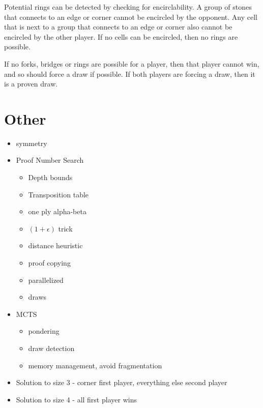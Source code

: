 Potential rings can be detected by checking for encirclability. A group of stones that connects to an edge or corner cannot be encircled by the opponent. Any cell that is next to a group that connects to an edge or corner also cannot be encircled by the other player. If no cells can be encircled, then no rings are possible.

If no forks, bridges or rings are possible for a player, then that player cannot win, and so should force a draw if possible. If both players are forcing a draw, then it is a proven draw.





\section{Other}

\begin{itemize}
\item symmetry
\item Proof Number Search
	\begin{itemize}
		\item Depth bounds
		\item Transposition table
		\item one ply alpha-beta
		\item $(1+\epsilon)$ trick
		\item distance heuristic
		\item proof copying
		\item parallelized
		\item draws
	\end{itemize}

\item MCTS
	\begin{itemize}
		\item pondering
		\item draw detection
		\item memory management, avoid fragmentation
	\end{itemize}

\item Solution to size 3 - corner first player, everything else second player
\item Solution to size 4 - all first player wins


\end{itemize}


